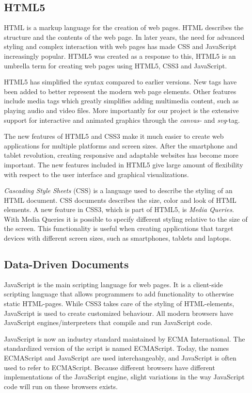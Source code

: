 \subsection{HTML5}
HTML is a markup language for the creation of web pages. HTML describes the structure and the contents of the web page. In later years, the need for advanced styling and complex interaction with web pages has made CSS and JavaScript increasingly popular. HTML5 was created as a response to this, HTML5 is an umbrella term for creating web pages using HTML5, CSS3 and JavaScript.

HTML5 has simplified the syntax compared to earlier versions. New tags have been added to better represent the modern web page elements. Other features include media tags which greatly simplifies adding multimedia content, such as playing audio and video files. More importantly for our project is the extensive support for interactive and animated graphics through the \emph{canvas-} and \emph{svg}-tag.

The new features of HTML5 and CSS3 make it much easier to create web applications for multiple platforms and screen sizes. After the smartphone and tablet revolution, creating responsive and adaptable websites has become more important. The new features included in HTML5 give large amount of flexibility with respect to the user interface and graphical visualizations.

\emph{Cascading Style Sheets} (CSS) is a language used to describe the styling of an HTML document. CSS documents describes the size, color and look of HTML elements. A new feature in CSS3, which is part of HTML5, is \emph{Media Queries}. With Media Queries it is possible to specify different styling relative to the size of the screen. This functionality is useful when creating applications that target devices with different screen sizes, such as smartphones, tablets and laptops. 

\subsection{Data-Driven Documents}
JavaScript is the main scripting language for web pages. It is a client-side scripting language that allows programmers to add functionality to otherwise static HTML-pages. While CSS3 takes care of the styling of HTML-elements, JavaScript is used to create customized behaviour. All modern browsers have JavaScript engines/interpreters that compile and run JavaScript code.

JavaScript is now an industry standard maintained by ECMA International. The standardized version of the script is named ECMAScript. Today, the names ECMAScript and JavaScript are used interchangeably, and JavaScript is often used to refer to ECMAScript. Because different browsers have different implementations of the JavaScript engine, slight variations in the way JavaScript code will run on these browsers exists.

